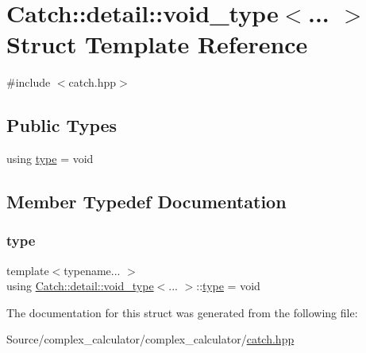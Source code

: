\hypertarget{struct_catch_1_1detail_1_1void__type}{}\section{Catch\+:\+:detail\+:\+:void\+\_\+type$<$... $>$ Struct Template Reference}
\label{struct_catch_1_1detail_1_1void__type}


{\ttfamily \#include $<$catch.\+hpp$>$}

\subsection*{Public Types}
\begin{DoxyCompactItemize}
\item 
using \mbox{\hyperlink{struct_catch_1_1detail_1_1void__type_ae7ab54169b5452caa24063fef95adf02}{type}} = void
\end{DoxyCompactItemize}


\subsection{Member Typedef Documentation}
\mbox{\label{struct_catch_1_1detail_1_1void__type_ae7ab54169b5452caa24063fef95adf02}} 
\subsubsection{\texorpdfstring{type}{type}}
{\footnotesize\ttfamily template$<$typename... $>$ \\
using \mbox{\hyperlink{struct_catch_1_1detail_1_1void__type}{Catch\+::detail\+::void\+\_\+type}}$<$... $>$\+::\mbox{\hyperlink{struct_catch_1_1detail_1_1void__type_ae7ab54169b5452caa24063fef95adf02}{type}} =  void}



The documentation for this struct was generated from the following file\+:\begin{DoxyCompactItemize}
\item 
Source/complex\+\_\+calculator/complex\+\_\+calculator/\mbox{\hyperlink{catch_8hpp}{catch.\+hpp}}\end{DoxyCompactItemize}
